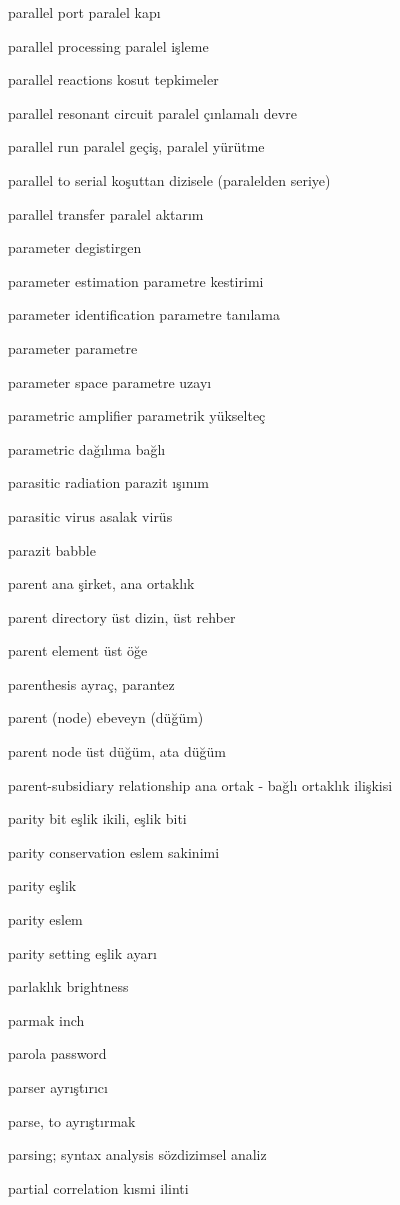\documentclass[12pt,fleqn]{article}\usepackage{../../common}
\begin{document}
parallel port paralel kapı

parallel processing paralel işleme

parallel reactions kosut tepkimeler

parallel resonant circuit paralel çınlamalı devre

parallel run paralel geçiş, paralel yürütme

parallel to serial koşuttan dizisele (paralelden seriye)

parallel transfer paralel aktarım

parameter degistirgen

parameter estimation parametre kestirimi

parameter identification parametre tanılama

parameter parametre

parameter space parametre uzayı

parametric amplifier parametrik yükselteç

parametric dağılıma bağlı

parasitic radiation parazit ışınım

parasitic virus asalak virüs

parazit babble

parent ana şirket, ana ortaklık

parent directory üst dizin, üst rehber

parent element üst öğe

parenthesis ayraç, parantez

parent (node) ebeveyn (düğüm)

parent node üst düğüm, ata düğüm

parent-subsidiary relationship ana ortak - bağlı ortaklık ilişkisi

parity bit eşlik ikili, eşlik biti

parity conservation eslem sakinimi

parity eşlik

parity eslem

parity setting eşlik ayarı

parlaklık brightness

parmak inch

parola password

parser ayrıştırıcı

parse, to ayrıştırmak

parsing; syntax analysis sözdizimsel analiz

partial correlation kısmi ilinti
\end{document}
